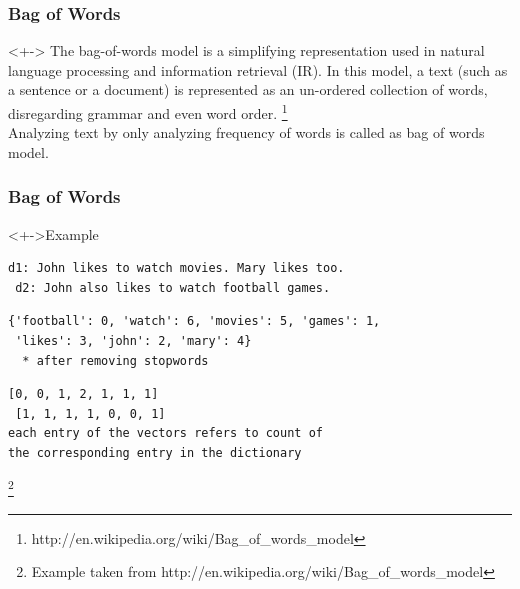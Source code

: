 \documentclass[serif,11pt,aspectratio=1610,table]{beamer}
\begin{document}
\begin{frame}[fragile]
 \frametitle{Bag of Words}

\begin{block}<+->{}
 The bag-of-words model is a simplifying representation used in natural language processing and information retrieval (IR). In this model, a text (such as a sentence or a document) is represented as an un-ordered collection of words, disregarding grammar and even word order. \footnote[]{http://en.wikipedia.org/wiki/Bag\_of\_words\_model} \\
 Analyzing text by only analyzing frequency of words is called as bag of words model.
\end{block}

\end{frame}

\begin{frame}[fragile]
 \frametitle{Bag of Words}
\begin{block}<+->{Example}
\begin{Verbatim}[frame=single]
 d1: John likes to watch movies. Mary likes too.
 d2: John also likes to watch football games.
\end{Verbatim}

\begin{Verbatim}[frame=single]
 {'football': 0, 'watch': 6, 'movies': 5, 'games': 1, 
 'likes': 3, 'john': 2, 'mary': 4}
  * after removing stopwords 
\end{Verbatim}

\begin{Verbatim}[frame=single]
 [0, 0, 1, 2, 1, 1, 1]
 [1, 1, 1, 1, 0, 0, 1]
each entry of the vectors refers to count of 
the corresponding entry in the dictionary
\end{Verbatim}
\footnote{Example taken from http://en.wikipedia.org/wiki/Bag\_of\_words\_model }
\end{block}

\end{frame}
\end{document}
